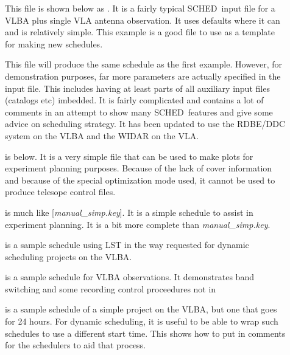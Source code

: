 \documentclass{report}
\newcommand{\schedb}{{\sc SCHED~}}
\begin{document}
\begin{description}

\item[] This
file is shown below as .  It
is a fairly typical \schedb input file for a VLBA plus single VLA
antenna observation.  It uses defaults where it can and is relatively
simple.  This example is a good file to use as a template for making
new schedules.

\item[]
This file will produce the same schedule as the
first example.  However, for demonstration purposes, far more
parameters are actually specified in the input file.  This includes
having at least parts of all auxiliary input files (catalogs etc)
imbedded.  It is fairly complicated and contains a lot of comments in
an attempt to show many \schedb features and give some advice on
scheduling strategy.  It has been updated to use the RDBE/DDC system
on the VLBA and the WIDAR on the VLA.

\item[] is  below.  It is a very simple file that can be
used to make plots for experiment planning purposes.  Because of the
lack of cover information and because of the special optimization mode
used, it cannot be used to produce telesope control files.

\item[] is
much like [{\sl manual\_simp.key}].  It is a simple schedule to assist
in experiment planning.  It is a bit more complete than {\sl
manual\_simp.key}.

\item[] is a
sample schedule using LST in the way requested for dynamic scheduling
projects on the VLBA.

\item[] is a
sample schedule for VLBA observations.  It demonstrates band switching
and some recording control proceedures not in 

\item[] is a
sample schedule of a simple project on the VLBA, but one that goes
for 24 hours.  For dynamic scheduling, it is useful to be able to
wrap such schedules to use a different start time.  This shows how
to put in comments for the schedulers to aid that process.


\end{description}
\end{document}

